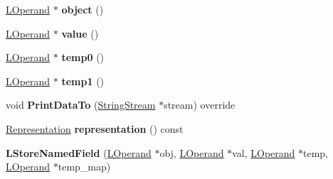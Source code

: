 \begin{DoxyCompactItemize}
\item 
\hyperlink{classv8_1_1internal_1_1_l_operand}{L\+Operand} $\ast$ {\bfseries object} ()\hypertarget{classv8_1_1internal_1_1_l_store_named_field_a322fe15f20a68dfd3429f31bb46ce109}{}\label{classv8_1_1internal_1_1_l_store_named_field_a322fe15f20a68dfd3429f31bb46ce109}

\item 
\hyperlink{classv8_1_1internal_1_1_l_operand}{L\+Operand} $\ast$ {\bfseries value} ()\hypertarget{classv8_1_1internal_1_1_l_store_named_field_a7c1b623b85070a53e7c8ca36113808c7}{}\label{classv8_1_1internal_1_1_l_store_named_field_a7c1b623b85070a53e7c8ca36113808c7}

\item 
\hyperlink{classv8_1_1internal_1_1_l_operand}{L\+Operand} $\ast$ {\bfseries temp0} ()\hypertarget{classv8_1_1internal_1_1_l_store_named_field_ad467fd8ef069fcf79358ee0ace488ed2}{}\label{classv8_1_1internal_1_1_l_store_named_field_ad467fd8ef069fcf79358ee0ace488ed2}

\item 
\hyperlink{classv8_1_1internal_1_1_l_operand}{L\+Operand} $\ast$ {\bfseries temp1} ()\hypertarget{classv8_1_1internal_1_1_l_store_named_field_a07fb229b5edca0b73a51226e3f8d4fc7}{}\label{classv8_1_1internal_1_1_l_store_named_field_a07fb229b5edca0b73a51226e3f8d4fc7}

\item 
void {\bfseries Print\+Data\+To} (\hyperlink{classv8_1_1internal_1_1_string_stream}{String\+Stream} $\ast$stream) override\hypertarget{classv8_1_1internal_1_1_l_store_named_field_a737f49c6847cd030f17c69b314c54b6c}{}\label{classv8_1_1internal_1_1_l_store_named_field_a737f49c6847cd030f17c69b314c54b6c}

\item 
\hyperlink{classv8_1_1internal_1_1_representation}{Representation} {\bfseries representation} () const \hypertarget{classv8_1_1internal_1_1_l_store_named_field_acf09ef122d9ca6738894c92b8f3e24ef}{}\label{classv8_1_1internal_1_1_l_store_named_field_acf09ef122d9ca6738894c92b8f3e24ef}

\item 
{\bfseries L\+Store\+Named\+Field} (\hyperlink{classv8_1_1internal_1_1_l_operand}{L\+Operand} $\ast$obj, \hyperlink{classv8_1_1internal_1_1_l_operand}{L\+Operand} $\ast$val, \hyperlink{classv8_1_1internal_1_1_l_operand}{L\+Operand} $\ast$temp, \hyperlink{classv8_1_1internal_1_1_l_operand}{L\+Operand} $\ast$temp\+\_\+map)\hypertarget{classv8_1_1internal_1_1_l_store_named_field_a11463f51eadad871a2d243b6aff1733c}{}\label{classv8_1_1internal_1_1_l_store_named_field_a11463f51eadad871a2d243b6aff1733c}


\end{DoxyCompactItemize}
